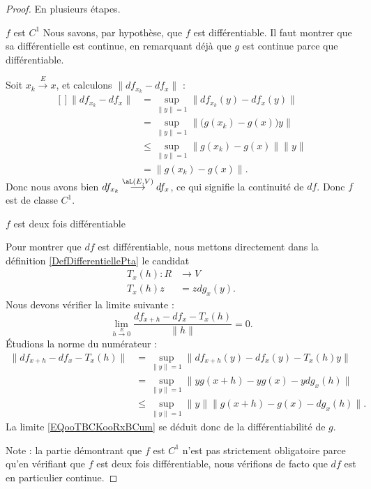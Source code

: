 \begin{proof}
	En plusieurs étapes.
	\begin{subproof}
		\item[\( f\) est \( C^1\)]
		Nous savons, par hypothèse, que \( f\) est différentiable. Il faut montrer que sa différentielle est continue, en remarquant déjà que \( g\) est continue parce que différentiable.

		Soit \( x_k\stackrel{E}{\longrightarrow}x\), et calculons \( \| df_{x_k}-df_x \|\) :
		\begin{equation}
			\begin{aligned}[]
				\| df_{x_k}-df_x \| & =\sup_{\| y \|=1}\| df_{x_k}(y)-df_x(y) \|    \\
				                    & =\sup_{\| y \|=1}\| \big(g(x_k)-g(x)\big)y \| \\
				                    & \leq\sup_{\| y \|=1}\| g(x_k)-g(x) \|\| y \|  \\
				                    & =\| g(x_k)-g(x) \|.
			\end{aligned}
		\end{equation}
		Donc nous avons bien \(df_{x_k}\stackrel{\aL(E,V)}{\longrightarrow}df_x\), ce qui signifie la continuité de \( df\). Donc \( f\) est de classe \( C^1\).

		\item[\( f\) est deux fois différentiable]

		Pour montrer que \( df\) est différentiable, nous mettons directement dans la définition \eqref{DefDifferentiellePta} le candidat
		\begin{equation}
			\begin{aligned}
				T_x(h)\colon R & \to V      \\
				T_x(h)z        & =zdg_x(y).
			\end{aligned}
		\end{equation}
		Nous devons vérifier la limite suivante :
		\begin{equation}        \label{EQooTBCKooRxBCum}
			\lim_{h\stackrel{E}{\longrightarrow} 0} \frac{ df_{x+h}-df_x-T_x(h) }{ \| h \| }=0.
		\end{equation}
		Étudions la norme du numérateur :
		\begin{subequations}
			\begin{align}
				\| df_{x+h}-df_x-T_x(h) \| & =\sup_{\| y \|=1}\| df_{x+h}(y)-df_x(y)-T_x(h)y \|      \\
				                           & =\sup_{\| y \|=1}\| yg(x+h)-yg(x)-ydg_x(h) \|           \\
				                           & \leq \sup_{\| y \|=1}\| y \| \| g(x+h)-g(x)-dg_x(h) \|.
			\end{align}
		\end{subequations}
		La limite \eqref{EQooTBCKooRxBCum} se déduit donc de la différentiabilité de \( g\).
	\end{subproof}
	Note : la partie démontrant que \( f\) est \( C^1\) n'est pas strictement obligatoire parce qu'en vérifiant que \( f\) est deux fois différentiable, nous vérifions de facto que \( df\) est en particulier continue.
\end{proof}

